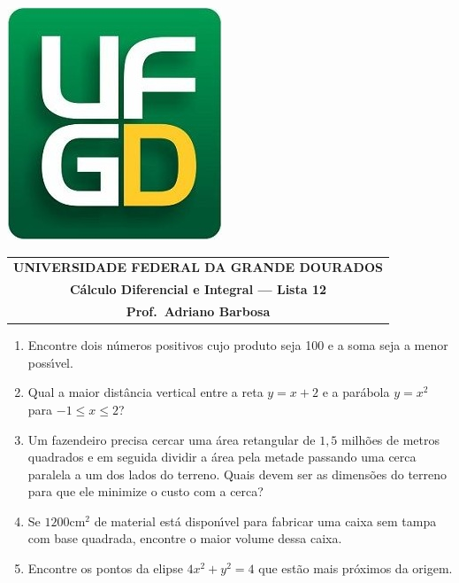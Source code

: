 \documentclass[a4paper,5pt]{amsbook}
\begin{document}
\thispagestyle{empty}
\pagestyle{empty}
\begin{minipage}[h]{0.14\textwidth}
	\includegraphics[scale=0.24]{../ufgd.png}
\end{minipage}
\begin{minipage}[h]{\textwidth}
\begin{tabular}{c}
{{\bf UNIVERSIDADE FEDERAL DA GRANDE DOURADOS}}\\
{{\bf C\'alculo Diferencial e Integral --- Lista 12}}\\
{{\bf Prof.\ Adriano Barbosa}}\\
\end{tabular}
\vspace{-0.45cm}
%
\end{minipage}


\vspace{1cm}
\begin{enumerate}
    \vspace{0.5cm}
    \item Encontre dois n\'umeros positivos cujo produto seja 100 e a soma seja a menor poss\'{\i}vel.

    \vspace{0.5cm}
    \item Qual a maior dist\^ancia vertical entre a reta $y=x+2$ e a par\'abola $y=x^2$ para $-1\le x \le 2$?

    \vspace{0.5cm}
    \item Um fazendeiro precisa cercar uma \'area retangular de $1,5$ milh\~oes de metros
        quadrados e em seguida dividir a \'area pela metade passando uma cerca paralela a um
        dos lados do terreno. Quais devem ser as dimens\~oes do terreno para que ele
        minimize o custo com a cerca?

    \vspace{0.5cm}
    \item Se $1200$cm$^2$ de material est\'a dispon\'{\i}vel para fabricar uma caixa
        sem tampa com base quadrada, encontre o maior volume dessa caixa.

    \vspace{0.5cm}
    \item Encontre os pontos da elipse $4x^2+y^2=4$ que est\~ao mais pr\'oximos da origem.
\end{enumerate}
\end{document}
